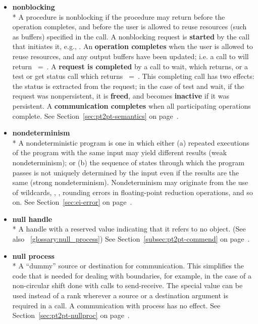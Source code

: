 \begin{itemize}
\label{glossary:nonblocking}
\item \textbf{ nonblocking} \\*
 A procedure is nonblocking if the procedure may return before the
operation completes, and before the user is allowed to reuse
resources (such as buffers) specified in the call.
A nonblocking request is {\bf started} by the call that initiates it, e.g.,
.
An {\bf operation completes} when the user is allowed
to reuse resources, and any output buffers have been updated; i.e. a
call to  will return
~=~.  A {\bf request is completed} by a call
to wait, which returns, or a test or get status call which returns
~=~.  This completing call has two effects:
the status is extracted from the request; in the case of test and
wait, if the request was nonpersistent, it is
{\bf freed}, and becomes {\bf inactive} if it was persistent.
A {\bf communication completes} when all participating operations complete.
See Section~\ref{sec:pt2pt-semantics} on page~\pageref{sec:pt2pt-semantics}.

\label{glossary:nondeterminism}
\item \textbf{ nondeterminism} \\*
A nondeterministic program is one in which either (a) repeated executions 
of the program with the same input may yield different results (weak 
nondeterminism); or (b) the sequence of states through which the program 
passes is not uniquely determined by the input even if the results are the 
same (strong nondeterminism). Nondeterminism may originate from the 
use of wildcards, , , rounding errors in floating-point 
reduction operations, and so on.
See Section~\ref{sec:ei-error} on page~\pageref{sec:ei-error}.

\label{glossary:null_handle}
\item \textbf{ null handle} \\*
A handle with a reserved value indicating that it refers to no object.
(See also ~\ref{glossary:null_process})
See Section~\ref{subsec:pt2pt-commend} on page~\pageref{subsec:pt2pt-commend}.


\label{glossary:null_process}
\item \textbf{ null process} \\*
A ``dummy'' source or
destination
for communication.  This simplifies the code that is needed for dealing with
boundaries, for example, in the case of a non-circular shift done with calls to
send-receive.
The special value  can be used
instead of a rank wherever a
source or a destination argument is required in a call.   A communication
with process  has no effect.
See Section~\ref{sec:pt2pt-nullproc} on page~\pageref{sec:pt2pt-nullproc}.


\end{itemize}
